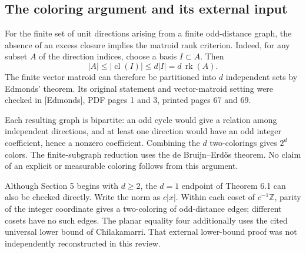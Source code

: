 \documentclass[10pt]{article}
\begin{document}
\subsection*{The coloring argument and its external input}
For the finite set of unit directions arising from a finite odd-distance graph, the absence of an excess closure implies the matroid rank criterion. Indeed, for any subset \(A\) of the direction indices, choose a basis \(I\subset A\). Then \[|A|\le|\operatorname{cl}(I)|\le d|I|=d\,\operatorname{rk}(A).\] The finite vector matroid can therefore be partitioned into \(d\) independent sets by Edmonds’ theorem. Its original statement and vector-matroid setting were checked in [Edmonds], PDF pages 1 and 3, printed pages 67 and 69.\par
Each resulting graph is bipartite: an odd cycle would give a relation among independent directions, and at least one direction would have an odd integer coefficient, hence a nonzero coefficient. Combining the \(d\) two-colorings gives \(2^d\) colors. The finite-subgraph reduction uses the de Bruijn–Erdős theorem. No claim of an explicit or measurable coloring follows from this argument.\par
Although Section 5 begins with \(d\ge2\), the \(d=1\) endpoint of Theorem 6.1 can also be checked directly. Write the norm as \(c|x|\). Within each coset of \(c^{-1}\mathbb Z\), parity of the integer coordinate gives a two-coloring of odd-distance edges; different cosets have no such edges. The planar equality four additionally uses the cited universal lower bound of Chilakamarri. That external lower-bound proof was not independently reconstructed in this review.\par
\end{document}
